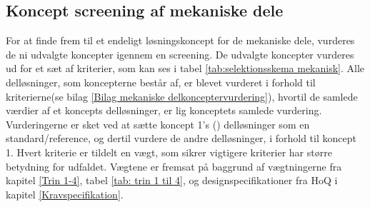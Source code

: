 \subsection{Koncept screening af mekaniske dele} \label{Mekanisk system - vurdering}
For at finde frem til et endeligt løsningskoncept for de mekaniske dele, vurderes de ni udvalgte koncepter igennem en screening. De udvalgte koncepter vurderes ud for et sæt af kriterier, som kan ses i tabel \ref{tab:selektionsskema mekanisk}. Alle delløsninger, som koncepterne består af, er blevet vurderet i forhold til kriterierne(se bilag \ref{Bilag mekaniske delkonceptervurdering}), hvortil de samlede værdier af et koncepts delløsninger, er lig konceptets samlede vurdering. Vurderingerne er sket ved at sætte koncept 1's (\lillacirc) delløsninger som en standard/reference, og dertil vurdere de andre delløsninger, i forhold til koncept 1. Hvert kriterie er tildelt en vægt, som sikrer vigtigere kriterier har større betydning for udfaldet. Vægtene er fremsat på baggrund af vægtningerne fra kapitel \ref{Trin 1-4}, tabel \ref{tab: trin 1 til 4}, og designspecifikationer fra HoQ i kapitel \ref{Kravspecifikation}.

